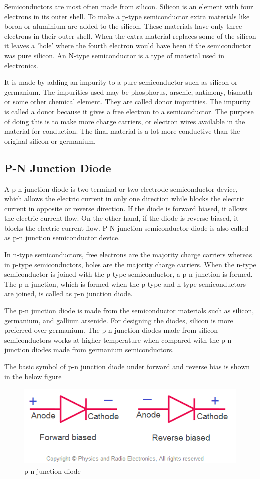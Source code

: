 \documentclass{article}
\begin{document}
Semiconductors are most often made from silicon. Silicon is an element with four electrons in its outer shell. To make a p-type semiconductor extra materials like boron or aluminium are added to the silicon. These materials have only three electrons in their outer shell. When the extra material replaces some of the silicon it leaves a 'hole' where the fourth electron would have been if the semiconductor was pure silicon.
An N-type semiconductor is a type of material used in electronics.

It is made by adding an impurity to a pure semiconductor such as silicon or germanium. The impurities used may be phosphorus, arsenic, antimony, bismuth or some other chemical element. They are called donor impurities. The impurity is called a donor because it gives a free electron to a semiconductor. The purpose of doing this is to make more charge carriers, or electron wires available in the material for conduction. The final material is a lot more conductive than the original silicon or germanium.
\newpage
	\subsection{P-N Junction Diode}
	A p-n junction diode is two-terminal or two-electrode semiconductor device, which allows the electric current in only one direction while blocks the electric current in opposite or reverse direction. If the diode is forward biased, it allows the electric current flow. On the other hand, if the diode is reverse biased, it blocks the electric current flow. P-N junction semiconductor diode is also called as p-n junction semiconductor device.

In n-type semiconductors, free electrons are the majority charge carriers whereas in p-type semiconductors, holes are the majority charge carriers. When the n-type semiconductor is joined with the p-type semiconductor, a p-n junction is formed. The p-n junction, which is formed when the p-type and n-type semiconductors are joined, is called as p-n junction diode.

The p-n junction diode is made from the semiconductor materials such as silicon, germanium, and gallium arsenide. For designing the diodes, silicon is more preferred over germanium. The p-n junction diodes made from silicon semiconductors works at higher temperature when compared with the p-n junction diodes made from germanium semiconductors.

The basic symbol of p-n junction diode under forward and reverse bias is shown in the below figure
	\begin{figure}[h!]
	\centering
		\includegraphics[height=4cm]{symbolofdiode.png}
	\caption{p-n junction diode}
	\end{figure}
\end{document}
